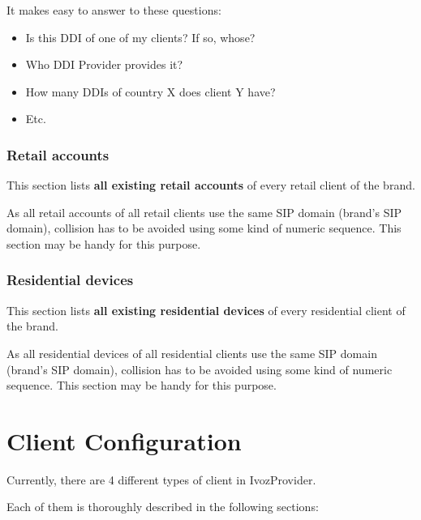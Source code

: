 \documentclass[letterpaper,10pt,english]{sphinxmanual}
\begin{document}
It makes easy to answer to these questions:
\begin{itemize}
\item {} 
Is this DDI of one of my clients? If so, whose?

\item {} 
Who DDI Provider provides it?

\item {} 
How many DDIs of country X does client Y have?

\item {} 
Etc.

\end{itemize}


\subsection{Retail accounts}
\label{administration_portal/brand/views/retail_accounts::doc}\label{administration_portal/brand/views/retail_accounts:retail-accounts}
This section lists \textbf{all existing retail accounts} of every retail client of the brand.

As all retail accounts of all retail clients use the same SIP domain (brand's SIP domain), collision has to be
avoided using some kind of numeric sequence. This section may be handy for this purpose.


\subsection{Residential devices}
\label{administration_portal/brand/views/residential_devices::doc}\label{administration_portal/brand/views/residential_devices:residential-devices}
This section lists \textbf{all existing residential devices} of every residential client of the brand.

As all residential devices of all residential clients use the same SIP domain (brand's SIP domain), collision has to be
avoided using some kind of numeric sequence. This section may be handy for this purpose.


\chapter{Client Configuration}
\label{administration_portal/client/index:client-configuration}\label{administration_portal/client/index::doc}
Currently, there are 4 different types of client in IvozProvider.

Each of them is thoroughly described in the following sections:
\end{document}
